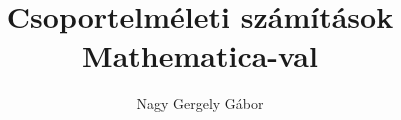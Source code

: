 \author{Nagy Gergely Gábor}
\title{Csoportelméleti számítások Mathematica-val}
\date{}
\maketitle
\clearpage

